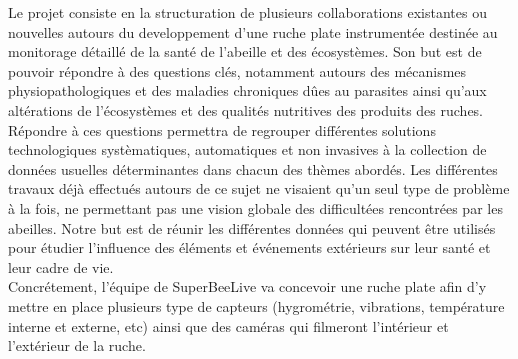 \documentclass[11pt,french,a4paper]{report}
\begin{document}
Le projet consiste en la structuration de plusieurs collaborations existantes ou nouvelles autours du developpement 
d’une ruche plate instrumentée destinée au monitorage détaillé de la santé de l’abeille et des écosystèmes. Son but est de
pouvoir répondre à des questions clés, notamment autours des mécanismes physiopathologiques et des maladies chroniques 
dûes au parasites ainsi qu’aux altérations de l’écosystèmes et des qualités nutritives des produits des ruches. \\
Répondre à ces questions permettra de regrouper différentes solutions technologiques systèmatiques, 
automatiques et non invasives à la collection de données usuelles déterminantes dans chacun des thèmes abordés.
Les différentes travaux déjà effectués autours de ce sujet ne visaient qu’un seul type de problème à la fois, 
ne permettant pas une vision globale des difficultées rencontrées par les abeilles. Notre but est de réunir les différentes
données qui peuvent être utilisés pour étudier l’influence des éléments et événements extérieurs sur leur santé et leur cadre de vie.\\

Concrétement, l'équipe de SuperBeeLive va concevoir une ruche plate afin d'y mettre en place plusieurs type de capteurs
(hygrométrie, vibrations, température interne et externe, etc) ainsi que des caméras qui filmeront l'intérieur et 
l'extérieur de la ruche. \\
\end{document}
